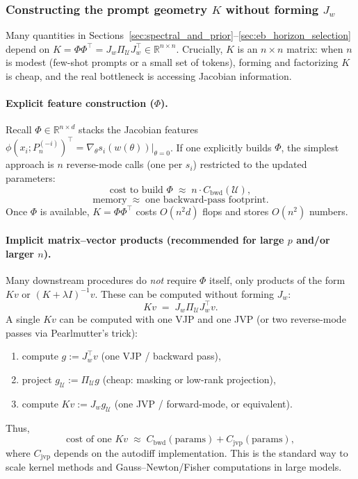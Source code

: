 \documentclass{article}
\theoremstyle{plain}
\theoremstyle{definition}
\theoremstyle{remark}
\begin{document}
\subsubsection{Constructing the prompt geometry $K$ without forming $J_w$}
Many quantities in Sections~\ref{sec:spectral_and_prior}--\ref{sec:eb_horizon_selection} depend on
$K=\Phi\Phi^\top=J_w\Pi_{\mathcal U}J_w^\top\in\mathbb{R}^{n\times n}$.
Crucially, $K$ is an $n\times n$ matrix: when $n$ is modest (few-shot prompts or a small set of tokens),
forming and factorizing $K$ is cheap, and the real bottleneck is accessing Jacobian information.

\paragraph{Explicit feature construction ($\Phi$).}
Recall $\Phi\in\mathbb{R}^{n\times d}$ stacks the Jacobian features
$\phi(x_i;P_n^{(-i)})^\top=\nabla_\theta s_i(w(\theta))\vert_{\theta=0}$.
If one explicitly builds $\Phi$, the simplest approach is $n$ reverse-mode calls (one per $s_i$) restricted to
the updated parameters:
\[
\text{cost to build }\Phi \;\approx\; n\cdot C_{\mathrm{bwd}}(\mathcal U),
\]
\[
\text{memory}\;\approx\;\text{one backward-pass footprint}.
\]
Once $\Phi$ is available, $K=\Phi\Phi^\top$ costs $O(n^2 d)$ flops and stores $O(n^2)$ numbers.

\paragraph{Implicit matrix--vector products (recommended for large $p$ and/or larger $n$).}
Many downstream procedures do \emph{not} require $\Phi$ itself, only products of the form $Kv$ or
$(K+\lambda I)^{-1}v$. These can be computed without forming $J_w$:
\begin{equation}
Kv \;=\; J_w\Pi_{\mathcal U}J_w^\top v.
\label{eq:app_K_matvec}
\end{equation}
A single $Kv$ can be computed with one VJP and one JVP (or two reverse-mode passes via Pearlmutter's trick):
\begin{enumerate}
\item compute $g := J_w^\top v$ \hfill (one VJP / backward pass),
\item project $g_{\mathcal U} := \Pi_{\mathcal U} g$ \hfill (cheap: masking or low-rank projection),
\item compute $Kv := J_w g_{\mathcal U}$ \hfill (one JVP / forward-mode, or equivalent).
\end{enumerate}
Thus,
\[
\text{cost of one }Kv \;\approx\; C_{\mathrm{bwd}}(\text{params}) + C_{\mathrm{jvp}}(\text{params}),
\]
where $C_{\mathrm{jvp}}$ depends on the autodiff implementation. This is the standard way to scale kernel methods
and Gauss--Newton/Fisher computations in large models.
\end{document}
